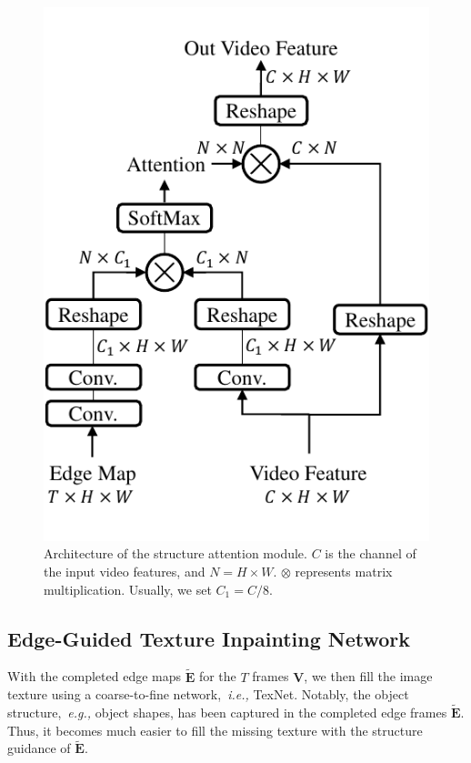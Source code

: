 \begin{figure}[t]
	\centering
	\includegraphics[width=0.65\columnwidth]{SEM} %
	\caption{Architecture of the structure attention module. $C$ is the channel of the input video features, and $N=H\times W$. $\otimes$ represents matrix multiplication. Usually, we set $C_1=C/8$.}
	\label{SEM}
\end{figure} 




\subsection{Edge-Guided Texture Inpainting Network}


With the completed edge maps $\boldsymbol{\widetilde{E}}$ for the $T$ frames $\boldsymbol{V}$, we then fill the image texture using a coarse-to-fine network,~\emph{i.e.,} TexNet.
%
Notably, the object structure,~\emph{e.g.,} object shapes, has been captured in the completed edge frames $\boldsymbol{\widetilde{E}}$.
Thus, it becomes much easier to fill the missing texture with the structure guidance of $\boldsymbol{\widetilde{E}}$.

